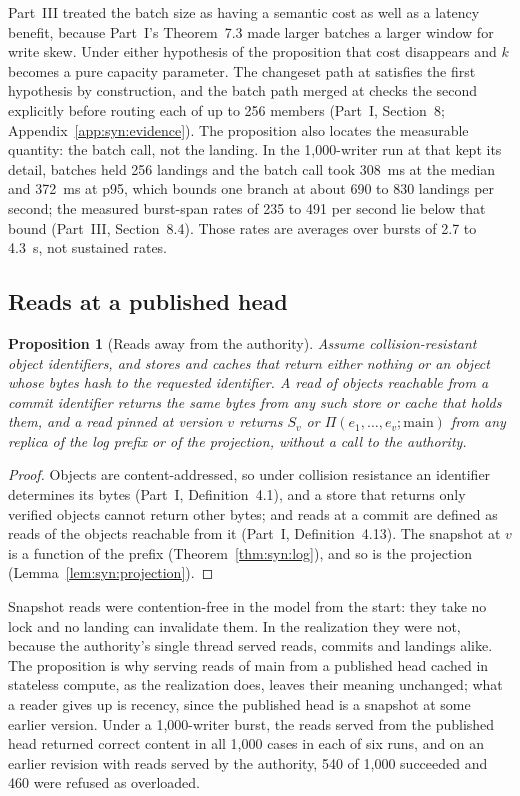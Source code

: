 \documentclass[11pt,letterpaper]{article}
\newtheorem{proposition}[theorem]{Proposition}
\theoremstyle{definition}
\theoremstyle{remark}
\newcommand{\Snap}[1]{S_{#1}}
\begin{document}
Part~III treated the batch size as having a semantic cost as well as a latency benefit, because Part~I's Theorem~7.3 made larger batches a larger window for write skew. Under either hypothesis of the proposition that cost disappears and $k$ becomes a pure capacity parameter. The changeset path at  satisfies the first hypothesis by construction, and the batch path merged at  checks the second explicitly before routing each of up to 256 members (Part~I, Section~8; Appendix~\ref{app:syn:evidence}). The proposition also locates the measurable quantity: the batch call, not the landing. In the 1,000-writer run at  that kept its detail, batches held 256 landings and the batch call took 308~ms at the median and 372~ms at p95, which bounds one branch at about 690 to 830 landings per second; the measured burst-span rates of 235 to 491 per second lie below that bound (Part~III, Section~8.4). %
Those rates are averages over bursts of 2.7 to 4.3~s, not sustained rates. %

\subsection{Reads at a published head}

\begin{proposition}[Reads away from the authority]
\label{prop:syn:reads}
Assume collision-resistant object identifiers, and stores and caches that return either nothing or an object whose bytes hash to the requested identifier. A read of objects reachable from a commit identifier returns the same bytes from any such store or cache that holds them, and a read pinned at version $v$ returns $\Snap{v}$ or $\Pi(e_1,\dots,e_v;\mathrm{main})$ from any replica of the log prefix or of the projection, without a call to the authority.
\end{proposition}

\begin{proof}
Objects are content-addressed, so under collision resistance an identifier determines its bytes (Part~I, Definition~4.1), and a store that returns only verified objects cannot return other bytes; and reads at a commit are defined as reads of the objects reachable from it (Part~I, Definition~4.13). The snapshot at $v$ is a function of the prefix (Theorem~\ref{thm:syn:log}), and so is the projection (Lemma~\ref{lem:syn:projection}).
\end{proof}

Snapshot reads were contention-free in the model from the start: they take no lock and no landing can invalidate them. In the realization they were not, because the authority's single thread served reads, commits and landings alike. The proposition is why serving reads of main from a published head cached in stateless compute, as the realization does, leaves their meaning unchanged; what a reader gives up is recency, since the published head is a snapshot at some earlier version. Under a 1,000-writer burst, the reads served from the published head returned correct content in all 1,000 cases in each of six runs, and on an earlier revision with reads served by the authority, 540 of 1,000 succeeded and 460 were refused as overloaded. %
\end{document}
